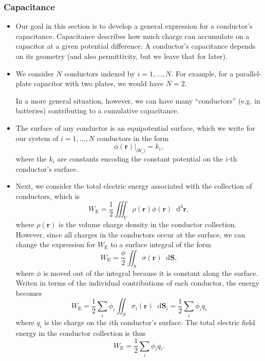 \documentclass[11pt, a4paper]{article}
\newcommand{\diff}{\mathop{}\!\mathrm{d}} %
\newcommand{\dr}{\diff^{3} \r}  %
\renewcommand{\vec}[1]{\bm{#1}} %
\renewcommand{\r}{\vec{r}}
\begin{document}
\subsubsection{Capacitance}
\begin{itemize}
	\item Our goal in this section is to develop a general expression for a conductor's capacitance. Capacitance describes how much charge can accumulate on a capacitor at a given potential difference. A conductor's capacitance depends on its geometry (and also permittivity, but we leave that for later).
	
	\item We consider $ N $ conductors indexed by $ i = 1, \ldots, N $. For example, for a parallel-plate capacitor with two plates, we would have $ N = 2 $. 

    In a more general situation, however, we can have many ``conductors'' (e.g. in batteries) contributing to a cumulative capacitance. 
	
    \item The surface of any conductor is an equipotential surface, which we write for our system of $ i = 1, \ldots, N $ conductors in the form
	\begin{equation*}
        \phi(\r) \big |_{\partial V_{i})}  = k_{i},
	\end{equation*}
	where the $ k_{i} $ are constants encoding the constant potential on the $ i $-th conductor's surface.
	
	\item Next, we consider the total electric energy associated with the collection of conductors, which is
	\begin{equation*}
		W_{\text{E}} = \frac{1}{2}\iiint_{V}\rho(\r)\phi(\r)\dr,
	\end{equation*}
	where $ \rho(\r) $ is the volume charge density in the conductor collection. However, since all charges in the conductors occur at the surface, we can change the expression for $ W_{\text{E}} $ to a surface integral of the form
	\begin{equation*}
		W_{\text{E}} = \frac{\phi}{2} \iint_{S} \sigma(\r) \diff \vec{S},
	\end{equation*}
	where $ \phi $ is moved out of the integral because it is constant along the surface. Writen in terms of the individual contributions of each conductor, the energy becomes
	\begin{equation*}
		W_{\text{E}} = \frac{1}{2}\sum_{i} \phi_{i} \iint_{S} \sigma_{i}(\r) \diff \vec{S}_{i} = \frac{1}{2}\sum_{i} \phi_{i} q_{i}
	\end{equation*}
	where $ q_{i} $ is the charge on the $ i $th conductor's surface. The total electric field energy in the conductor collection is thus
	\begin{equation*}
		W_{\text{E}} = \frac{1}{2}\sum_{i} \phi_{i}q_{i}.
	\end{equation*}
	

\end{itemize}
\end{document}
